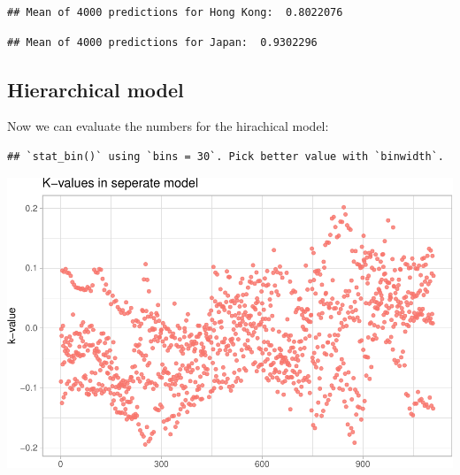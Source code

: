 \documentclass[
]{article}
\newenvironment{Shaded}{\begin{snugshade}}{\end{snugshade}}
\newcommand{\AttributeTok}[1]{\textcolor[rgb]{0.77,0.63,0.00}{#1}}
\newcommand{\DecValTok}[1]{\textcolor[rgb]{0.00,0.00,0.81}{#1}}
\newcommand{\FunctionTok}[1]{\textcolor[rgb]{0.00,0.00,0.00}{#1}}
\newcommand{\NormalTok}[1]{#1}
\newcommand{\SpecialCharTok}[1]{\textcolor[rgb]{0.00,0.00,0.00}{#1}}
\newcommand{\StringTok}[1]{\textcolor[rgb]{0.31,0.60,0.02}{#1}}
\begin{document}
\begin{verbatim}
## Mean of 4000 predictions for Hong Kong:  0.8022076
\end{verbatim}

\begin{Shaded}
\end{Shaded}

\begin{verbatim}
## Mean of 4000 predictions for Japan:  0.9302296
\end{verbatim}

\hypertarget{hierarchical-model}{%
\subsection{Hierarchical model}\label{hierarchical-model}}

Now we can evaluate the numbers for the hirachical model:

\begin{Shaded}
\end{Shaded}

\begin{verbatim}
## `stat_bin()` using `bins = 30`. Pick better value with `binwidth`.
\end{verbatim}

\includegraphics{bda_project_files/figure-latex/unnamed-chunk-36-1.pdf}
\end{document}
